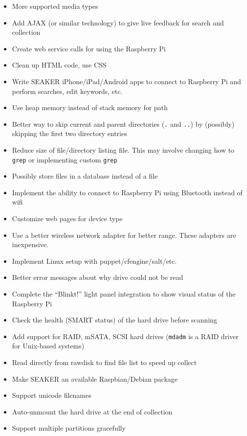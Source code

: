 \documentclass[12pt]{article}
\begin{document}
\footnotesize{
\vspace{0.5 cm}
\begin{itemize}
  \item More supported media types
  \item Add AJAX (or similar technology) to give live feedback for search and collection
  \item Create web service calls for using the Raspberry Pi
  \item Clean up HTML code, use CSS
  \item Write SEAKER iPhone/iPad/Android apps to connect to Raspberry Pi and perform searches, edit keywords, etc.
  \item Use heap memory instead of stack memory for path
  \item Better way to skip current and parent directories (\verb|.| and \verb|..|) by (possibly) skipping the first two directory entries
  \item Reduce size of file/directory listing file. This may involve changing how to \verb|grep| or implementing custom \verb|grep|
  \item Possibly store files in a database instead of a file
  \item Implement the ability to connect to Raspberry Pi using Bluetooth instead of \gls{wifi}
  \item Customize web pages for device type
  \item Use a better wireless network adapter for better range. These adapters are inexpensive.
  \item Implement Linux setup with puppet/cfengine/salt/etc.
  \item Better error messages about why drive could not be read
  \item Complete the “Blinkt!” light panel integration to show visual status of the Raspberry Pi
  \item Check the health (SMART status) of the hard drive before scanning
  \item Add support for RAID, mSATA, SCSI hard drives (\verb|mdadm| is a RAID driver for Unix-based systems)
  \item Read directly from rawdisk to find file list to speed up collect
  \item Make SEAKER an available Raspbian/Debian package
  \item Support unicode filenames
  \item Auto-unmount the hard drive at the end of collection
  \item Support multiple partitions gracefully

\end{itemize}}
\end{document}
